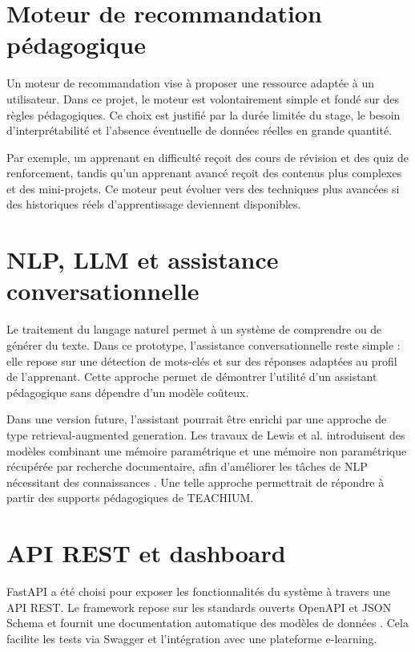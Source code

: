\documentclass[12pt,a4paper]{report}
\begin{document}
\section{Moteur de recommandation pédagogique}

Un moteur de recommandation vise à proposer une ressource adaptée à un utilisateur. Dans ce projet, le moteur est volontairement simple et fondé sur des règles pédagogiques. Ce choix est justifié par la durée limitée du stage, le besoin d'interprétabilité et l'absence éventuelle de données réelles en grande quantité.

Par exemple, un apprenant en difficulté reçoit des cours de révision et des quiz de renforcement, tandis qu'un apprenant avancé reçoit des contenus plus complexes et des mini-projets. Ce moteur peut évoluer vers des techniques plus avancées si des historiques réels d'apprentissage deviennent disponibles.

\section{NLP, LLM et assistance conversationnelle}

Le traitement du langage naturel permet à un système de comprendre ou de générer du texte. Dans ce prototype, l'assistance conversationnelle reste simple : elle repose sur une détection de mots-clés et sur des réponses adaptées au profil de l'apprenant. Cette approche permet de démontrer l'utilité d'un assistant pédagogique sans dépendre d'un modèle coûteux.

Dans une version future, l'assistant pourrait être enrichi par une approche de type retrieval-augmented generation. Les travaux de Lewis et al. introduisent des modèles combinant une mémoire paramétrique et une mémoire non paramétrique récupérée par recherche documentaire, afin d'améliorer les tâches de NLP nécessitant des connaissances \cite{rag-lewis}. Une telle approche permettrait de répondre à partir des supports pédagogiques de TEACHIUM.

\section{API REST et dashboard}

FastAPI a été choisi pour exposer les fonctionnalités du système à travers une API REST. Le framework repose sur les standards ouverts OpenAPI et JSON Schema et fournit une documentation automatique des modèles de données \cite{fastapi-docs}. Cela facilite les tests via Swagger et l'intégration avec une plateforme e-learning.
\end{document}
